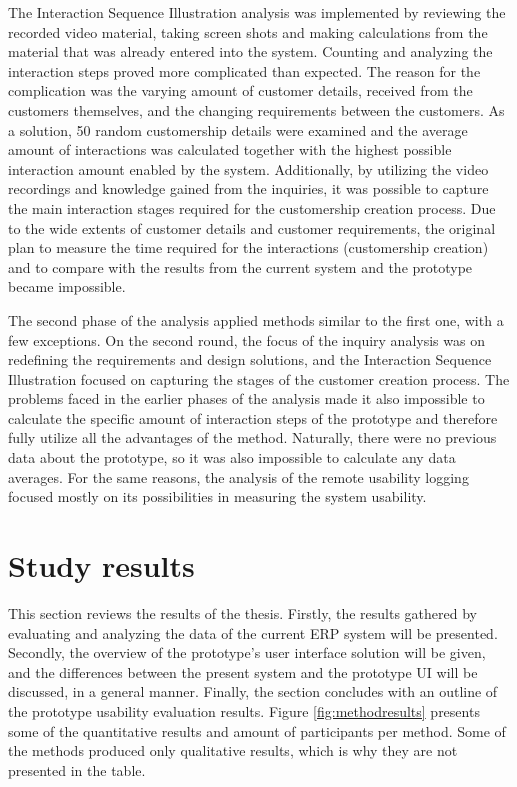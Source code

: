 \documentclass[12pt,a4paper,oneside,pdftex]{report}
\begin{document}
The Interaction Sequence Illustration analysis was implemented by reviewing the recorded video material, taking screen shots  and making calculations from the material that was already entered into the system. Counting and analyzing the interaction steps proved more complicated than expected. The reason for the complication was the varying amount of customer details, received from the customers themselves, and the changing requirements between the customers. As a solution, 50 random customership details were examined and the average amount of interactions was calculated together with the highest possible interaction amount enabled by the system. Additionally, by utilizing the video recordings and knowledge gained from the inquiries, it was possible to capture the main interaction stages required for the customership creation process. Due to the wide extents of customer details and customer requirements, the original plan to measure the time required for the interactions (customership creation) and to compare with the results from the current system and the prototype became impossible. 

The second phase of the analysis applied methods similar to the first one, with a few exceptions.  On the second round, the focus of the inquiry analysis was on redefining the requirements and design solutions, and the Interaction Sequence Illustration focused on capturing the stages of the customer creation process. The problems faced in the earlier phases of the analysis made it also impossible to calculate the specific amount of interaction steps of the prototype and therefore fully utilize all the advantages of the method. Naturally, there were no previous data about the prototype, so it was also impossible to calculate any data averages. For the same reasons, the analysis of the remote usability logging focused mostly on its possibilities in measuring the system usability. 


\section{Study results}
\label{sec:results}
This section reviews the results of the thesis. Firstly, the results gathered by evaluating and analyzing the data of the current ERP system will be presented. Secondly, the overview of the prototype's user interface solution will be given, and the differences between the present system and the prototype UI will be discussed, in a general manner. Finally, the section concludes with an outline of the prototype usability evaluation results. Figure \ref{fig:methodresults} presents some of the quantitative results and amount of participants per method. Some of the methods produced only qualitative results, which is why they are not presented in the table.
    
\end{document}
